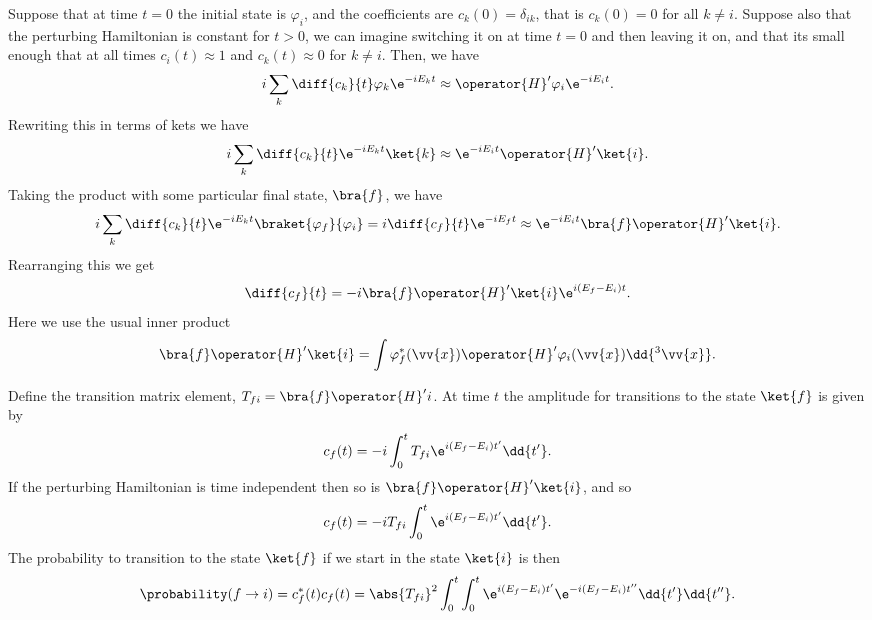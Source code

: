 Suppose that at time \(t = 0\) the initial state is \(\varphi_i\), and the coefficients are \(c_k(0) = \delta_{ik}\), that is \(c_k(0) = 0\) for all \(k \ne i\).
Suppose also that the perturbing Hamiltonian is constant for \(t > 0\), we can imagine switching it on at time \(t = 0\) and then leaving it on, and that its small enough that at all times \(c_i(t) \approx 1\) and \(c_k(t) \approx 0\) for \(k \ne i\).
Then, we have
\begin{equation}
    i \sum_k \diff{c_k}{t} \varphi_k \e^{-iE_kt} \approx \operator{H}'\varphi_i\e^{-iE_it}.
\end{equation}
Rewriting this in terms of kets we have
\begin{equation}
    i \sum_k \diff{c_k}{t} \e^{-iE_kt} \ket{k} \approx \e^{-iE_it}\operator{H}'\ket{i}.
\end{equation}
Taking the product with some particular final state, \(\bra{f}\), we have
\begin{equation}
    i \sum_k \diff{c_k}{t} \e^{-iE_kt} \braket{\varphi_f}{\varphi_i} = i\diff{c_f}{t} \e^{-iE_ft} \approx \e^{-iE_it} \bra{f} \operator{H}' \ket{i}.
\end{equation}
Rearranging this we get
\begin{equation}
    \diff{c_f}{t} = -i \bra{f} \operator{H}' \ket{i} \e^{i(E_f - E_i)t}.
\end{equation}
Here we use the usual inner product
\begin{equation}
    \bra{f} \operator{H}' \ket{i} = \int \varphi_f^*(\vv{x}) \operator{H}' \varphi_i(\vv{x}) \dd{^3\vv{x}}.
\end{equation}

Define the transition matrix element, \(T_{fi} = \bra{f} \operator{H}' {i}\).
At time \(t\) the amplitude for transitions to the state \(\ket{f}\) is given by
\begin{equation}
    c_f(t) = -i \int_0^t T_{fi} \e^{i(E_f - E_i)t'} \dd{t'}.
\end{equation}
If the perturbing Hamiltonian is time independent then so is \(\bra{f} \operator{H}' \ket{i}\), and so
\begin{equation}\label{eqn:fermi's golden rule cf}
    c_f(t) = -iT_{fi} \int_0^t \e^{i(E_f - E_i)t'} \dd{t'}.
\end{equation}
The probability to transition to the state \(\ket{f}\) if we start in the state \(\ket{i}\) is then
\begin{equation}
    \probability(f \to i) = c_f^*(t)c_f(t) = \abs{T_{fi}}^2 \int_{0}^{t} \int_{0}^{t} \e^{i(E_f - E_i)t'} \e^{-i(E_f - E_i)t''} \dd{t'} \dd{t''}.
\end{equation}


